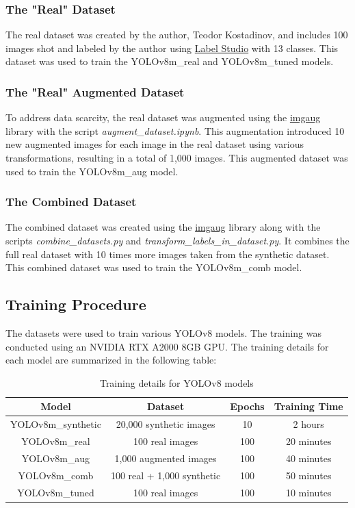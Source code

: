 \documentclass{article}
\begin{document}
\subsubsection{The "Real" Dataset}
The real dataset was created by the author, Teodor Kostadinov, and includes 100 images shot and labeled by the author using \href{https://labelstud.io/}{Label Studio} with 13 classes. This dataset was used to train the YOLOv8m\_real and YOLOv8m\_tuned models.

\subsubsection{The "Real" Augmented Dataset}
To address data scarcity, the real dataset was augmented using the \href{https://imgaug.readthedocs.io/en/latest/}{imgaug} library with the script \textit{augment\_dataset.ipynb}. This augmentation introduced 10 new augmented images for each image in the real dataset using various transformations, resulting in a total of 1,000 images. This augmented dataset was used to train the YOLOv8m\_aug model.

\subsubsection{The Combined Dataset}
The combined dataset was created using the \href{https://imgaug.readthedocs.io/en/latest/}{imgaug} library along with the scripts \textit{combine\_datasets.py} and \textit{transform\_labels\_in\_dataset.py}. It combines the full real dataset with 10 times more images taken from the synthetic dataset. This combined dataset was used to train the YOLOv8m\_comb model.

\subsection{Training Procedure}
The datasets were used to train various YOLOv8 models. The training was conducted using an NVIDIA RTX A2000 8GB GPU. The training details for each model are summarized in the following table:

\begin{table}[htbp]
\centering
\begin{tabular}{|c|c|c|c|}
\hline
\textbf{Model} & \textbf{Dataset} & \textbf{Epochs} & \textbf{Training Time} \\ \hline
YOLOv8m\_synthetic & 20,000 synthetic images & 10 & 2 hours \\ \hline
YOLOv8m\_real & 100 real images & 100 & 20 minutes \\ \hline
YOLOv8m\_aug & 1,000 augmented images & 100 & 40 minutes \\ \hline
YOLOv8m\_comb & 100 real + 1,000 synthetic & 100 & 50 minutes \\ \hline
YOLOv8m\_tuned & 100 real images & 100 & 10 minutes \\ \hline
\end{tabular}
\caption{Training details for YOLOv8 models}
\label{table:1}
\end{table}
\end{document}
